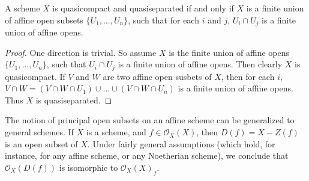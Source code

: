 \begin{theorem}
    A scheme $X$ is quasicompact and quasiseparated if and only if $X$ is a finite union of affine open subsets $\{ U_1,\dots,U_n \}$, such that for each $i$ and $j$, $U_i \cap U_j$ is a finite union of affine opens.
\end{theorem}
\begin{proof}
    One direction is trivial. So assume $X$ is the finite union of affine opens $\{ U_1,\dots,U_n \}$, such that $U_i \cap U_j$ is a finite union of affine opens. Then clearly $X$ is quasicompact. If $V$ and $W$ are two affine open susbets of $X$, then for each $i$, $V \cap W = (V \cap W \cap U_1) \cup \dots \cup (V \cap W \cap U_n)$ is a finite union of affine opens. Thus $X$ is quasiseparated.
\end{proof}

The notion of principal open subsets on an affine scheme can be generalized to general schemes. If $X$ is a scheme, and $f \in \mathcal{O}_X(X)$, then $D(f) = X - Z(f)$ is an open subset of $X$. Under fairly general assumptions (which hold, for instance, for any affine scheme, or any Noetherian scheme), we conclude that $\mathcal{O}_X(D(f))$ is isomorphic to $\mathcal{O}_X(X)_f$.

